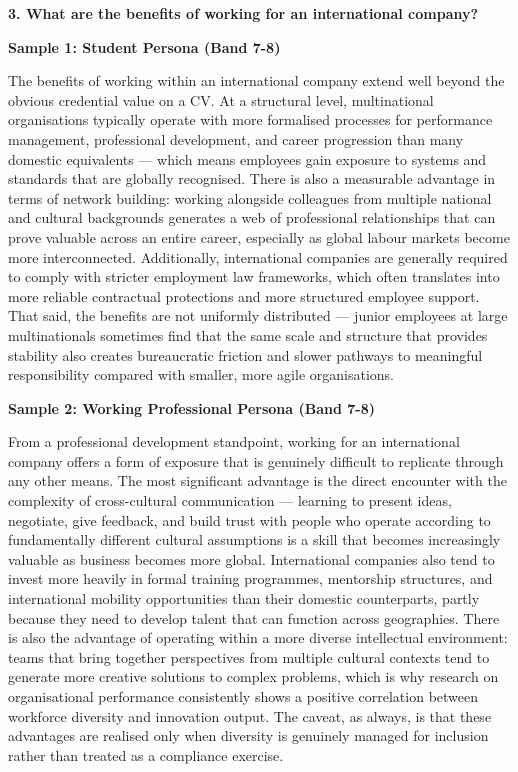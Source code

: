 \separator

\begin{ieltsquestion}
\textbf{3. What are the benefits of working for an international company?}
\end{ieltsquestion}
\textbf{Sample 1: Student Persona (Band 7-8)}

The benefits of working within an international company extend well beyond the obvious credential value on a CV. At a structural level, multinational organisations typically operate with more formalised processes for performance management, professional development, and career progression than many domestic equivalents — which means employees gain exposure to systems and standards that are globally recognised. There is also a measurable advantage in terms of network building: working alongside colleagues from multiple national and cultural backgrounds generates a web of professional relationships that can prove valuable across an entire career, especially as global labour markets become more interconnected. Additionally, international companies are generally required to comply with stricter employment law frameworks, which often translates into more reliable contractual protections and more structured employee support. That said, the benefits are not uniformly distributed — junior employees at large multinationals sometimes find that the same scale and structure that provides stability also creates bureaucratic friction and slower pathways to meaningful responsibility compared with smaller, more agile organisations.

\textbf{Sample 2: Working Professional Persona (Band 7-8)}

From a professional development standpoint, working for an international company offers a form of exposure that is genuinely difficult to replicate through any other means. The most significant advantage is the direct encounter with the complexity of cross-cultural communication — learning to present ideas, negotiate, give feedback, and build trust with people who operate according to fundamentally different cultural assumptions is a skill that becomes increasingly valuable as business becomes more global. International companies also tend to invest more heavily in formal training programmes, mentorship structures, and international mobility opportunities than their domestic counterparts, partly because they need to develop talent that can function across geographies. There is also the advantage of operating within a more diverse intellectual environment: teams that bring together perspectives from multiple cultural contexts tend to generate more creative solutions to complex problems, which is why research on organisational performance consistently shows a positive correlation between workforce diversity and innovation output. The caveat, as always, is that these advantages are realised only when diversity is genuinely managed for inclusion rather than treated as a compliance exercise.

